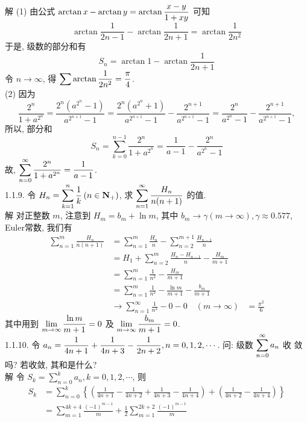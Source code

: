 \documentclass[a4paper,11pt,UTF8]{article}
\begin{document}
解 (1) 由公式 $\displaystyle \displaystyle \displaystyle \arctan x-\arctan y=\arctan \frac{x-y}{1+x y}$ 可知
$$
\arctan \frac{1}{2 n-1}-\arctan \frac{1}{2 n+1}=\arctan \frac{1}{2 n^2}
$$
于是, 级数的部分和有
$$
S_n=\arctan 1-\arctan \frac{1}{2 n+1}
$$
令 $n \rightarrow \infty$, 得 $\displaystyle \displaystyle \displaystyle \sum \arctan \frac{1}{2 n^2}=\frac{\pi}{4}$.\\
(2) 因为
$$
\frac{2^n}{1+a^{2^n}}=\frac{2^n\left(a^{2^n}-1\right)}{a^{2^{n+1}}-1}=\frac{2^n\left(a^{2^n}+1\right)}{a^{2^{n+1}}-1}-\frac{2^{n+1}}{a^{2^{n+1}}-1}=\frac{2^n}{a^{2^n}-1}-\frac{2^{n+1}}{a^{2^{n+1}}-1},
$$
所以, 部分和
$$
S_n=\sum_{k=0}^{n-1} \frac{2^n}{1+a^{2^n}}=\frac{1}{a-1}-\frac{2^n}{a^{2^n}-1}
$$
故, $\displaystyle \displaystyle \displaystyle \sum_{n=0}^{\infty} \frac{2^n}{1+a^{2^n}}=\frac{1}{a-1}$.\\
1.1.9. 令 $\displaystyle \displaystyle \displaystyle H_n=\sum_{k=1}^n \frac{1}{k}\left(n \in \mathbf{N}_{+}\right)$, 求 $\displaystyle \displaystyle \displaystyle \sum_{n=1}^{\infty} \frac{H_n}{n(n+1)}$ 的值.\\
解 对正整数 $m$, 注意到 $H_m=b_m+\ln m$, 其中 $b_m \rightarrow \gamma(m \rightarrow \infty), \gamma \approx 0.577$,
Euler常数, 我们有
$$
\begin{aligned}
	\sum_{n=1}^m \frac{H_n}{n(n+1)} & =\sum_{n=1}^m \frac{H_n}{n}-\sum_{n=2}^{m+1} \frac{H_{n-1}}{n} \\
	& =H_1+\sum_{n=2}^m \frac{H_n-H_{n-1}}{n}-\frac{H_m}{m+1} \\
	& =\sum_{n=1}^m \frac{1}{n^2}-\frac{H_m}{m+1} \\
	& =\sum_{n=1}^m \frac{1}{n^2}-\frac{\ln m}{m+1}-\frac{b_m}{m+1} \\
	& \rightarrow \sum_{n=1}^{\infty} \frac{1}{n^2}-0-0 \quad(m \rightarrow \infty)
	& =\frac{\pi^2}{6}
\end{aligned}
$$
其中用到 $\displaystyle \displaystyle \displaystyle \lim _{m \rightarrow \infty} \frac{\ln m}{m+1}=0$ 及 $\displaystyle \displaystyle \displaystyle \lim _{m \rightarrow \infty} \frac{b_m}{m+1}=0$.\\
1.1.10. 令 $\displaystyle \displaystyle \displaystyle a_n=\frac{1}{4 n+1}+\frac{1}{4 n+3}-\frac{1}{2 n+2}, n=0,1,2, \cdots$. 问: 级数 $\displaystyle \displaystyle \displaystyle \sum_{n=0}^{\infty} a_n$ 收 敛吗? 若收敛, 其和是什么?\\
解 令 $S_k=\sum_{n=0}^k a_n, k=0,1,2, \cdots$, 则
$$
\begin{aligned}
	S_k & =\sum_{n=0}^k\left\{\left(\frac{1}{4 n+1}-\frac{1}{4 n+2}+\frac{1}{4 n+3}-\frac{1}{4 n+4}\right)+\left(\frac{1}{4 n+2}-\frac{1}{4 n+4}\right)\right\} \\
	& =\sum_{m=1}^{4 k+4} \frac{(-1)^{m-1}}{m}+\frac{1}{2} \sum_{m=1}^{2 k+2} \frac{(-1)^{m-1}}{m}
\end{aligned}
$$
\end{document}
